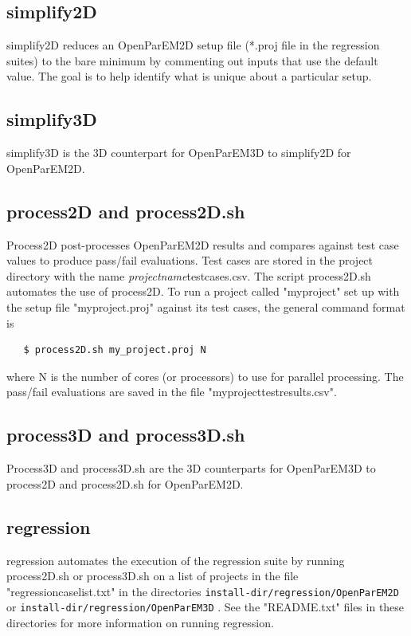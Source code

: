 \documentclass[titlepage]{article}
\renewcommand\_{\textunderscore\linebreak[1]}
\begin{document}
\subsection{simplify2D}

simplify2D reduces an OpenParEM2D setup file (*.proj file in the regression suites) to the bare minimum by commenting out inputs that use the default value.  The goal is to help identify what is unique about a particular setup.

\subsection{simplify3D}

simplify3D is the 3D counterpart for OpenParEM3D to simplify2D for OpenParEM2D.

\subsection{process2D and process2D.sh}

Process2D post-processes OpenParEM2D results and compares against test case values to produce pass/fail evaluations.  Test cases are stored in the project directory with the name \textit{project\_name}\_test\_cases.csv.  The script process2D.sh automates the use of process2D.  To run a project called "my\_project" set up with the setup file "my\_project.proj" against its test cases, the general command format is

\begin{verbatim}
   $ process2D.sh my_project.proj N
\end{verbatim}
\noindent where N is the number of cores (or processors) to use for parallel processing.  The pass/fail evaluations are saved in the file "my\_project\_test\_results.csv".

\subsection{process3D and process3D.sh}

Process3D and process3D.sh are the 3D counterparts for OpenParEM3D to process2D and process2D.sh for OpenParEM2D. 

\subsection{regression}

regression automates the execution of the regression suite by running process2D.sh or process3D.sh on a list of projects in the file "regression\_case\_list.txt" in the directories \verb+install-dir/regression/OpenParEM2D+ or \verb+install-dir/regression/OpenParEM3D+ .  See the "README.txt" files in these directories for more information on running regression.
\end{document}

